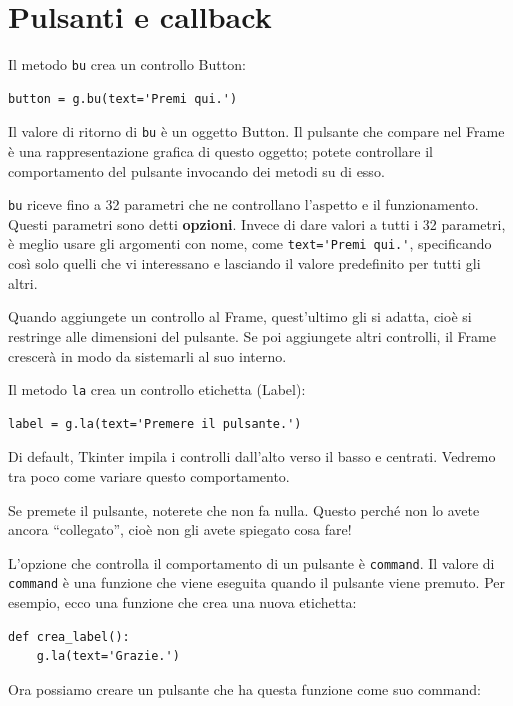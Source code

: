 \documentclass[10pt]{book}
\begin{document}
\section{Pulsanti e callback}

Il metodo {\tt bu} crea un controllo Button:

\begin{verbatim}
button = g.bu(text='Premi qui.')
\end{verbatim}
%
Il valore di ritorno di {\tt bu} è un oggetto Button. Il pulsante che compare nel Frame è una rappresentazione grafica di questo oggetto; potete controllare il comportamento del pulsante invocando dei metodi su di esso.

{\tt bu} riceve fino a 32 parametri che ne controllano l'aspetto e il funzionamento. Questi parametri sono detti
{\bf opzioni}.  Invece di dare valori a tutti i 32 parametri, è meglio usare gli argomenti con nome, come \verb"text='Premi qui.'",
specificando così solo quelli che vi interessano e lasciando il valore predefinito per tutti gli altri.

Quando aggiungete un controllo al Frame, quest'ultimo gli si adatta, cioè si restringe alle dimensioni del pulsante. Se poi aggiungete altri controlli, il Frame crescerà in modo da sistemarli al suo interno.

Il metodo {\tt la} crea un controllo etichetta (Label):

\begin{verbatim}
label = g.la(text='Premere il pulsante.')
\end{verbatim}
%
Di default, Tkinter impila i controlli dall'alto verso il basso e centrati. Vedremo tra poco come variare questo comportamento.

Se premete il pulsante, noterete che non fa nulla. Questo perché non lo avete ancora ``collegato'', cioè non gli avete spiegato cosa fare!

L'opzione che controlla il comportamento di un pulsante è {\tt command}.
Il valore di {\tt command} è una funzione che viene eseguita quando il pulsante viene premuto. Per esempio, ecco una funzione che crea una nuova etichetta:

\begin{verbatim}
def crea_label():
    g.la(text='Grazie.')
\end{verbatim}
%
Ora possiamo creare un pulsante che ha questa funzione come suo command:
\end{document}
